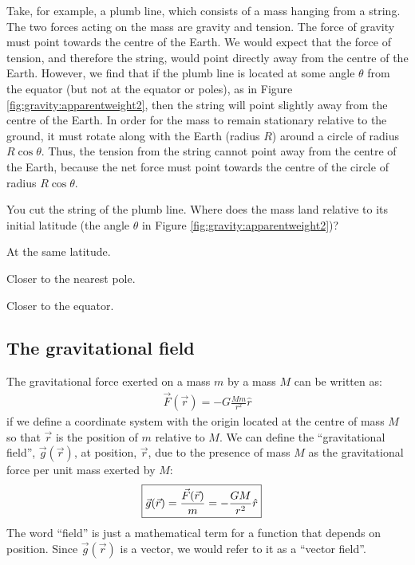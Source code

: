 Take, for example, a plumb line, which consists of a mass hanging from a string. The two forces acting on the mass are gravity and tension. The force of gravity must point towards the centre of the Earth. We would expect that the force of tension, and therefore the string, would point directly away from the centre of the Earth. However, we find that if the plumb line is located at some angle $\theta$ from the equator (but not at the equator or poles), as in Figure \ref{fig:gravity:apparentweight2}, then the string will point slightly away from the centre of the Earth.  In order for the mass to remain stationary relative to the ground, it must rotate along with the Earth (radius $R$) around a circle of radius $R\cos\theta$.   Thus, the tension from the string cannot point away from the centre of the Earth, because the net force must point towards the centre of the circle of radius $R\cos\theta$.


\begin{checkpoint}
\begin{MCquestion}{You cut the string of the plumb line. Where does the mass land relative to its initial latitude (the angle $\theta$ in Figure \ref{fig:gravity:apparentweight2})? }
\item At the same latitude.\correct
\item Closer to the nearest pole.
\item Closer to the equator. %
\end{MCquestion}
\end{checkpoint}

\subsection{The gravitational field}
The gravitational force exerted on a mass $m$ by a mass $M$ can be written as:
\begin{align*}
\vec F(\vec r) = -G\frac{Mm}{r^2}\hat r
\end{align*}
if we define a coordinate system with the origin located at the centre of mass $M$ so that $\vec r$ is the position of $m$ relative to $M$. We can define the ``gravitational field'', $\vec g(\vec r)$, at position, $\vec r$, due to the presence of mass $M$ as the gravitational force per unit mass exerted by $M$:
\begin{align}
\Aboxed{\vec g(\vec r) = \frac{\vec F(\vec r)}{m} =  - \frac{GM}{r^2}\hat r}
\end{align}
The word ``field'' is just a mathematical term for a function that depends on position. Since $\vec g(\vec r)$ is a vector, we would refer to it as a ``vector field''.

